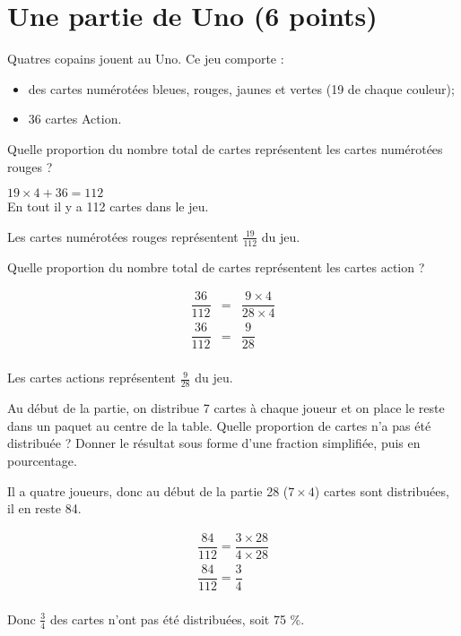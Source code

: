 \section{Une partie de Uno (6 points)}

Quatres copains jouent au Uno. Ce jeu comporte :

\begin{itemize}
	\item des cartes numérotées bleues, rouges, jaunes et vertes (19 de chaque couleur);
	\item 36 cartes Action.
\end{itemize}

\begin{questions}
	\question[2] Quelle proportion du nombre total de cartes représentent les cartes numérotées rouges ?
	\begin{solution}
		$19 \times 4 + 36 = 112$\\
		
		En tout il y a 112 cartes dans le jeu.
		
		Les cartes numérotées rouges représentent $\frac{19}{112}$ du jeu.
	\end{solution}

	
	
	\question[2] Quelle proportion du nombre total de cartes représentent les cartes action ?
	\begin{solution}
		\begin{eqnarray*}
			\dfrac{36}{112} &=& \dfrac{9 \times 4}{28 \times 4} \\
			\dfrac{36}{112} &=& \dfrac{9}{28} \\
		\end{eqnarray*}
	
	Les cartes actions représentent $\frac{9}{28}$ du jeu.
	\end{solution}
	
	\question[2] Au début de la partie, on distribue 7 cartes à chaque joueur et on place le reste dans un paquet au centre de la table. Quelle proportion de cartes n'a pas été distribuée ? Donner le résultat sous forme d'une fraction simplifiée, puis en pourcentage.
	
	\begin{solution}
		Il a quatre joueurs, donc au début de la partie 28 ($7 \times 4$) cartes sont distribuées, il en reste 84.
		
		\begin{eqnarray*}
			\dfrac{84}{112} = \dfrac{3 \times 28}{4 \times 28} \\
			\dfrac{84}{112} = \dfrac{3}{4} \\
		\end{eqnarray*}
	
		Donc $\frac{3}{4}$ des cartes n'ont pas été distribuées, soit 75 \%.
	\end{solution}
\end{questions}